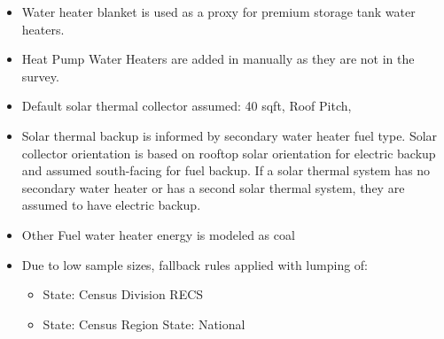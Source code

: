 \begin{itemize}
\item Water heater blanket is used as a proxy for premium storage tank water heaters.
\item Heat Pump Water Heaters are added in manually as they are not in the survey.
\item Default solar thermal collector assumed: 40 sqft, Roof Pitch,
\item Solar thermal backup is informed by secondary water heater fuel type. Solar collector orientation is based on rooftop solar orientation for electric backup and assumed south-facing for fuel backup. If a solar thermal system has no secondary water heater or has a second solar thermal system, they are assumed to have electric backup.
\item Other Fuel water heater energy is modeled as coal
\item Due to low sample sizes, fallback rules applied with lumping of:
  \begin{itemize}
  \item State: Census Division RECS
  \item State: Census Region State: National
  \end{itemize}
\end{itemize}
